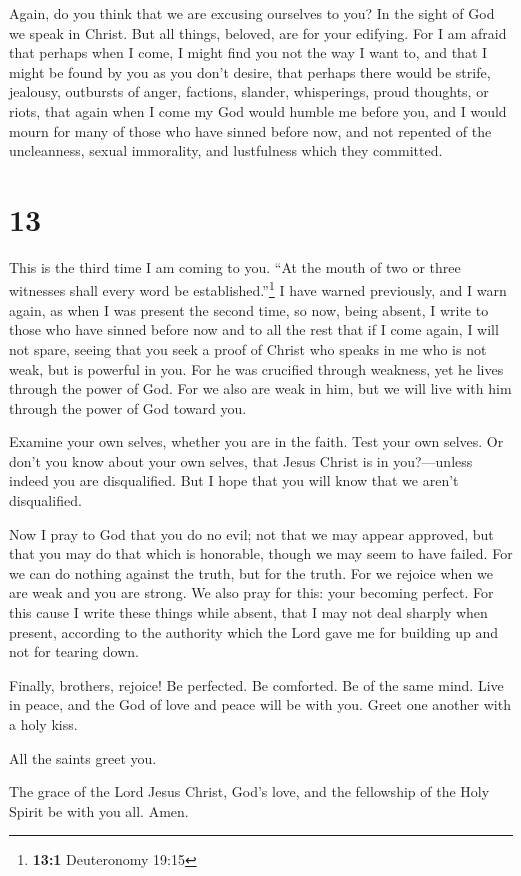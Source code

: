  Again, do you think that we are excusing ourselves to
you? In the sight of God we speak in Christ. But all things, beloved,
are for your edifying.  For I am afraid that perhaps when
I come, I might find you not the way I want to, and that I might be
found by you as you don't desire, that perhaps there would be strife,
jealousy, outbursts of anger, factions, slander, whisperings, proud
thoughts, or riots,  that again when I come my God would
humble me before you, and I would mourn for many of those who have
sinned before now, and not repented of the uncleanness, sexual
immorality, and lustfulness which they committed.

\hypertarget{section-12}{%
\section{13}\label{section-12}}

 This is the third time I am coming to you. ``At the mouth
of two or three witnesses shall every word be established.''\footnote{\textbf{13:1}
  Deuteronomy 19:15}  I have warned previously, and I warn
again, as when I was present the second time, so now, being absent, I
write to those who have sinned before now and to all the rest that if I
come again, I will not spare,  seeing that you seek a
proof of Christ who speaks in me who is not weak, but is powerful in
you.  For he was crucified through weakness, yet he lives
through the power of God. For we also are weak in him, but we will live
with him through the power of God toward you.

 Examine your own selves, whether you are in the faith.
Test your own selves. Or don't you know about your own selves, that
Jesus Christ is in you?---unless indeed you are disqualified.
 But I hope that you will know that we aren't
disqualified.

 Now I pray to God that you do no evil; not that we may
appear approved, but that you may do that which is honorable, though we
may seem to have failed.  For we can do nothing against
the truth, but for the truth.  For we rejoice when we are
weak and you are strong. We also pray for this: your becoming perfect.
 For this cause I write these things while absent, that I
may not deal sharply when present, according to the authority which the
Lord gave me for building up and not for tearing down.

 Finally, brothers, rejoice! Be perfected. Be comforted.
Be of the same mind. Live in peace, and the God of love and peace will
be with you.  Greet one another with a holy kiss.

 All the saints greet you.

 The grace of the Lord Jesus Christ, God's love, and the
fellowship of the Holy Spirit be with you all. Amen.
